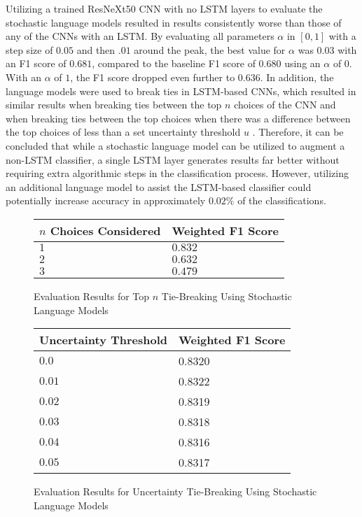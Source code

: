 Utilizing a trained ResNeXt50 CNN with no LSTM layers to evaluate the stochastic language models resulted in results consistently worse than those of any of the CNNs with an LSTM. By evaluating all parameters $\alpha$ in $[0,1]$ with a step size of $0.05$ and then $.01$ around the peak, the best value for $\alpha$ was $0.03$ with an F1 score of $0.681$, compared to the baseline F1 score of $0.680$ using an $\alpha$ of $0$. With an $\alpha$ of $1$, the F1 score dropped even further to $0.636$. In addition, the language models were used to break ties in LSTM-based CNNs, which resulted in similar results when breaking ties between the top $n$ choices of the CNN  and when breaking ties between the top choices when there was a difference between the top choices of less than a set uncertainty threshold $u$ . Therefore, it can be concluded that while a stochastic language model can be utilized to augment a non-LSTM classifier, a single LSTM layer generates results far better without requiring extra algorithmic steps in the classification process. However, utilizing an additional language model to assist the LSTM-based classifier could potentially increase accuracy in approximately $0.02\%$ of the classifications.

\begin{figure}[H]
    \caption{Evaluation Results for Top $n$ Tie-Breaking Using Stochastic Language Models}
    \label{fig:classificationMarkovTopN}
    \centering
    \begin{tabular}{ | l | l | }
        \hline
        $n$ Choices Considered & Weighted F1 Score \\
        \hline
        $1$ & $0.832$ \\
        $2$ & $0.632$ \\
        $3$ & $0.479$ \\
        \hline
    \end{tabular}
\end{figure}

\begin{figure}[H]
    \caption{Evaluation Results for Uncertainty Tie-Breaking Using Stochastic Language Models}
    \label{fig:classificationMarkovUncertainty}
    \centering
    \begin{tabular}{ | l | l | }
        \hline
        Uncertainty Threshold & Weighted F1 Score \\
        \hline
        $0.0$ & 0.8320 \\
        $0.01$ & 0.8322 \\
        $0.02$ & 0.8319 \\
        $0.03$ & 0.8318 \\
        $0.04$ & 0.8316 \\
        $0.05$ & 0.8317 \\
        \hline
    \end{tabular}
\end{figure}

